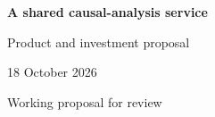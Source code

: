 \documentclass[11pt,a4paper]{article}
\begin{document}
\begin{center}{\LARGE\bfseries A shared causal-analysis service\par}\vspace{3mm}
{\large Product and investment proposal\par}\vspace{2mm}
18 October 2026\par Working proposal for review
\end{center}

\clearpage


\end{document}
